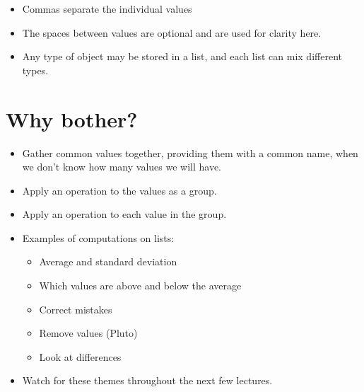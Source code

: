 \documentclass[letterpaper,10pt,english]{sphinxmanual}
\begin{document}
\begin{itemize}
\begin{itemize}
\item {} 
Commas separate the individual values

\item {} 
The spaces between values are optional and are used for clarity
here.

\item {} 
Any type of object may be stored in a list, and each list can mix
different types.

\end{itemize}

\end{itemize}


\section{Why bother?}
\label{\detokenize{lecture_notes/lec08_lists1:why-bother}}\begin{itemize}
\item {} 
Gather common values together, providing them with a common name,
 when we don’t know how many values we will have.

\item {} 
Apply an operation to the values as a group.

\item {} 
Apply an operation to each value in the group.

\item {} 
Examples of computations on lists:
\begin{itemize}
\item {} 
Average and standard deviation

\item {} 
Which values are above and below the average

\item {} 
Correct mistakes

\item {} 
Remove values (Pluto)

\item {} 
Look at differences

\end{itemize}

\item {} 
Watch for these themes throughout the next few lectures.

\end{itemize}
\end{document}
